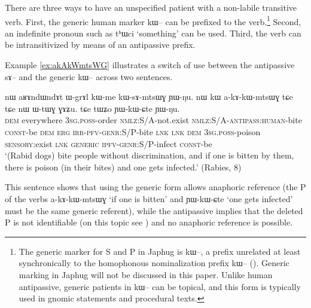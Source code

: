 \documentclass[oldfontcommands,oneside,a4paper,11pt]{article}
\newcommand{\ipa}[1]{{\phon \mbox{#1}}} %
\begin{document}
 
There are three ways to have an unspecified patient with a non-labile transitive verb.  First,  the generic human marker \ipa{kɯ}-- can be prefixed to the verb.\footnote{The generic marker for S and P in Japhug is \ipa{kɯ}--, a prefix unrelated at least synchronically to the homophonous nominalization prefix \ipa{kɯ}--  (\citealt[204-89]{jacques12demotion}). Generic marking in Japhug will not be discussed in this paper. Unlike human antipassive, generic patients in \ipa{kɯ}-- can be topical, and this form is typically used in gnomic statements and procedural texts.} Second,  an indefinite pronoun such as \ipa{tʰɯci} `something' can be used. Third, the verb can be intransitivized by means of an antipassive prefix.



Example \ref{ex:akAkWmtsWG} illustrates a switch of use between the   antipassive \ipa{sɤ}-- and the generic \ipa{kɯ}-- across two sentences.

\begin{exe}
\ex \label{ex:akAkWmtsWG}
\gll
\ipa{nɯ} 	\ipa{aʁɤndɯndɤt} 	\ipa{ɯ-grɤl} 	\ipa{kɯ-me} 	\ipa{kɯ-sɤ-mtsɯɣ} 	\ipa{ɲɯ-ŋu.} 
 \ipa{nɯ} 	\ipa{kɯ} 	\ipa{a-kɤ-kɯ-mtsɯɣ} 	\ipa{tɕe} 	\ipa{tɕe} 	\ipa{nɯ} 	\ipa{ɯ-tɯɣ} 	\ipa{ɣɤʑu.} \ipa{tɕe} 	\ipa{tɯʑo} 	\ipa{ɲɯ-kɯ-ɕte} 	\ipa{ɲɯ-ŋu.} 
 \\
 \textsc{dem} everywhere \textsc{3sg.poss}-order \textsc{nmlz}:S/A-not.exist \textsc{nmlz}:S/A-\textsc{antipass:human}-bite \textsc{const}-be \textsc{dem} \textsc{erg} \textsc{irr-pfv-genr}:S/P-bite \textsc{lnk} \textsc{lnk} \textsc{dem} \textsc{3sg.poss}-poison \textsc{sensory}:exist \textsc{lnk} \textsc{generic} \textsc{ipfv-genr}:S/P-infect \textsc{const}-be\\ 
\glt `(Rabid dogs)  bite people without discrimination, and if one is bitten by them, there is poison (in their bites) and one gets infected.'  (Rabies, 8)
\end{exe}

This sentence shows that using   the generic form allows anaphoric reference (the P of the verbs \ipa{a-kɤ-kɯ-mtsɯɣ} `if one is bitten' and  	\ipa{ɲɯ-kɯ-ɕte}   `one gets infected' must be the same generic referent), while the antipassive implies that the deleted P is not identifiable  (on this topic see \citealt[52]{cooreman94antipassive}) and no anaphoric reference is possible.
\end{document}
